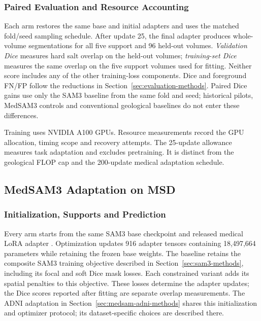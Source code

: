 \documentclass[12pt,a4paper]{article}
\begin{document}
\subsubsection{Paired Evaluation and Resource Accounting}

Each arm restores the same base and initial adapters and uses the matched
fold/seed sampling schedule. After update 25, the final adapter produces
whole-volume segmentations for all five support and 96 held-out volumes.
\emph{Validation Dice} measures hard salt overlap on the held-out
volumes; \emph{training-set Dice} measures the same overlap on the five
support volumes used for fitting. Neither score includes any of the
other training-loss components. Dice and foreground FN/FP follow the
reductions in Section~\ref{sec:evaluation-methods}. Paired Dice gains
use only the SAM3 baseline from the same fold and seed;
historical pilots, MedSAM3 controls and conventional geological
baselines do not enter these differences.

Training uses NVIDIA A100 GPUs. Resource measurements record the GPU
allocation, timing scope and recovery attempts. The 25-update allowance
measures task adaptation and excludes pretraining. It is distinct from the geological FLOP cap
and the 200-update medical adaptation schedule.

\subsection{MedSAM3 Adaptation on MSD}
\label{sec:medsam-methods}

\subsubsection{Initialization, Supports and Prediction}

Every arm starts from the same SAM3 base checkpoint and released medical
LoRA adapter \cite{carion2025sam3,liu2025medsam3}. Optimization updates
916 adapter tensors containing 18,497,664 parameters while retaining
the frozen base weights. The baseline retains the composite SAM3
training objective described in Section~\ref{sec:sam3-methods}, including
its focal and soft Dice mask losses. Each constrained variant adds its
spatial penalties to this objective. These losses determine the adapter
updates; the Dice scores reported after fitting are separate overlap
measurements. The ADNI adaptation in
Section~\ref{sec:medsam-adni-methods} shares this initialization and
optimizer protocol; its dataset-specific choices are described there.
\end{document}
